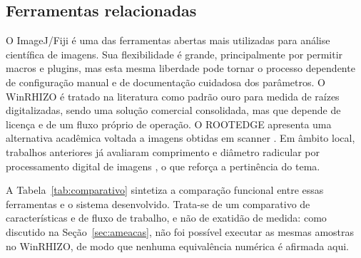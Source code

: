 \documentclass[12pt]{article}
\begin{document}
\subsection{Ferramentas relacionadas}

O ImageJ/Fiji \cite{schneider2012imagej,schindelin2012fiji} é uma das ferramentas abertas mais utilizadas para análise científica de imagens. Sua flexibilidade é grande, principalmente por permitir macros e plugins, mas esta mesma liberdade pode tornar o processo dependente de configuração manual e de documentação cuidadosa dos parâmetros. O WinRHIZO \cite{arsenault1995winrhizo} é tratado na literatura como padrão ouro para medida de raízes digitalizadas, sendo uma solução comercial consolidada, mas que depende de licença e de um fluxo próprio de operação. O ROOTEDGE apresenta uma alternativa acadêmica voltada a imagens obtidas em scanner \cite{rootedge1997}. Em âmbito local, trabalhos anteriores já avaliaram comprimento e diâmetro radicular por processamento digital de imagens \cite{maruyama2016avaliacao}, o que reforça a pertinência do tema.

A Tabela~\ref{tab:comparativo} sintetiza a comparação funcional entre essas ferramentas e o sistema desenvolvido. Trata-se de um comparativo de características e de fluxo de trabalho, e não de exatidão de medida: como discutido na Seção~\ref{sec:ameacas}, não foi possível executar as mesmas amostras no WinRHIZO, de modo que nenhuma equivalência numérica é afirmada aqui.

\vspace{5mm}

\begin{table}[!htbp]
\centering
\caption{Comparação funcional entre as ferramentas e o sistema desenvolvido.}
\label{tab:comparativo}
\end{table}
\end{document}
